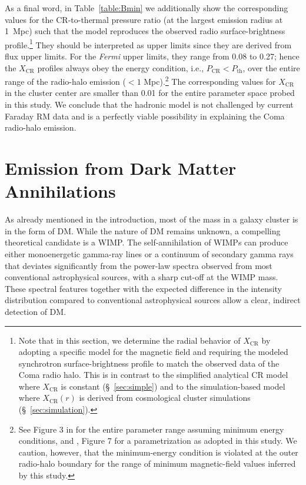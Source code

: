 \documentclass[12pt,manuscript]{aastex}
\def\Fermi{{\em Fermi}\xspace}
\newcommand{\CR}{\mathrm{CR}}
\begin{document}
As a final word, in Table~\ref{table:Bmin} we additionally show the corresponding values for the
CR-to-thermal pressure ratio (at the largest emission radius at 1~Mpc) such that the model
reproduces the observed radio surface-brightness profile.\footnote{Note that in this section, we
determine the radial behavior of $X_\CR$ by adopting a specific model for the magnetic field and
requiring the modeled synchrotron surface-brightness profile to match the observed data of the
Coma radio halo. This is in contrast to the simplified analytical CR model where $X_\CR$ is
constant (\S~\ref{sec:simple}) and to the simulation-based model where $X_\CR(r)$ is derived from
cosmological cluster simulations (\S~\ref{sec:simulation}).} They should be interpreted as upper
limits since they are derived from flux upper limits. For the \Fermi upper limits, they range from
0.08 to 0.27; hence the $X_{\CR}$ profiles always obey the energy condition, i.e., $P_{\CR} <
P_{\mathrm{th}}$, over the entire range of the radio-halo emission ($< 1$ Mpc).\footnote{See Figure
  3 in \citet{article:PfrommerEnsslin:2004a} for the entire parameter range assuming minimum energy
  conditions, and \citet{article:PfrommerEnsslin:2004b}, Figure 7 for a parametrization as adopted
  in this study. We caution, however, that the minimum-energy condition is violated at the outer
  radio-halo boundary for the range of minimum magnetic-field values inferred by this study.} The
corresponding values for $X_\CR$ in the cluster center are smaller than 0.01 for the entire
parameter space probed in this study. We conclude that the hadronic model is not challenged by
current Faraday RM data and is a perfectly viable possibility in explaining the Coma radio-halo
emission.

%
%

\section{Emission from Dark Matter Annihilations}
As already mentioned in the introduction, most of the mass in a galaxy cluster is in the form of
DM. While the nature of DM remains unknown, a compelling theoretical candidate is a
WIMP. The self-annihilation of WIMPs can produce either monoenergetic gamma-ray lines or a
continuum of secondary gamma rays that deviates significantly from the power-law spectra observed
from most conventional astrophysical sources, with a sharp cut-off at the WIMP mass. These spectral
features together with the expected difference in the intensity distribution compared to
conventional astrophysical sources allow a clear, indirect detection of DM.
\end{document}
